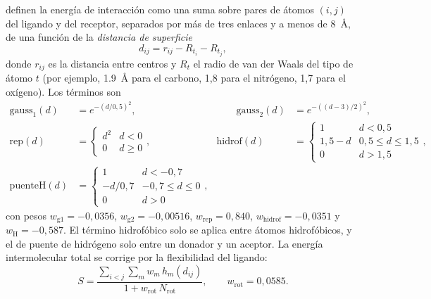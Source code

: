 \textcite{c15-trott2010} definen la energía de interacción como una suma sobre pares de átomos $(i,j)$ del ligando y del receptor, separados por más de tres enlaces y a menos de \SI{8}{\angstrom}, de una función de la \emph{distancia de superficie}
\begin{equation}\label{eq:15-dsup}
d_{ij}=r_{ij}-R_{t_i}-R_{t_j},
\end{equation}
donde $r_{ij}$ es la distancia entre centros y $R_t$ el radio de van der Waals del tipo de átomo $t$ (por ejemplo, \SI{1,9}{\angstrom} para el carbono, 1,8 para el nitrógeno, 1,7 para el oxígeno). Los términos son
\begin{equation}\label{eq:15-vina}
\begin{aligned}
\mathrm{gauss}_1(d)&=e^{-(d/0{,}5)^2}, &\qquad
\mathrm{gauss}_2(d)&=e^{-((d-3)/2)^2},\\[2pt]
\mathrm{rep}(d)&=\begin{cases}d^2 & d<0\\0 & d\ge0\end{cases}, &
\mathrm{hidrof}(d)&=\begin{cases}1 & d<0{,}5\\ 1{,}5-d & 0{,}5\le d\le1{,}5\\ 0 & d>1{,}5\end{cases},\\[2pt]
\mathrm{puenteH}(d)&=\begin{cases}1 & d<-0{,}7\\ -d/0{,}7 & -0{,}7\le d\le0\\ 0 & d>0\end{cases},
\end{aligned}
\end{equation}
con pesos $w_{\mathrm{g1}}=-0{,}0356$, $w_{\mathrm{g2}}=-0{,}00516$, $w_{\mathrm{rep}}=0{,}840$, $w_{\mathrm{hidrof}}=-0{,}0351$ y $w_{\mathrm{H}}=-0{,}587$. El término hidrofóbico solo se aplica entre átomos hidrofóbicos, y el de puente de hidrógeno solo entre un donador y un aceptor. La energía intermolecular total se corrige por la flexibilidad del ligando:
\begin{equation}\label{eq:15-vinarot}
S=\frac{\sum_{i<j} \sum_{m} w_m\,h_m(d_{ij})}{1+w_{\mathrm{rot}}\,N_{\mathrm{rot}}},\qquad w_{\mathrm{rot}}=0{,}0585.
\end{equation}

\begin{simbolos}
\end{simbolos}

